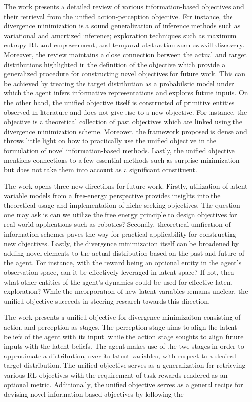 \documentclass[10.5pt,letterpaper]{article}
\begin{document}
The work presents a detailed review of various information-based objectives and their retrieval from the unified action-perception objective. For instance, the divergence minimization is a sound generalization of inference methods such as variational and amortized inference; exploration techniques such as maximum entropy RL and empowerment; and temporal abstraction such as skill discovery. Moreover, the review maintains a close connection between the actual and target distributions highlighted in the definition of the objective which provide a generalized procedure for constructing novel objectives for future work. This can be achieved by treating the target distribution as a probabilstic model under which the agent infers informative representations and explores future inputs. On the other hand, the unified objective itself is constructed of primitive entities observed in literature and does not give rise to a new objective. For instance, the objective is a theoretical collection of past objectives which are linked using the divergence minimization scheme. Moreover, the framework proposed is dense and throws little light on how to practically use the unified objective in the formulation of novel information-based methods. Lastly, the unified objective mentions connections to a few essential methods such as surprise minimization but does not take them into account as a significant constituent.

The work opens three new directions for future work. Firstly, utilization of latent variable models from a free-energy perspective provides insights into the theoretical usage and implementation of niche-seeking objectives. The question one may ask is can we utilize the free energy principle to design objectives for real world applications such as robotics? Secondly, theoretical unification of information schemes paves the way for practical applicability for constructing new objectives. Lastly, the divergence minimization itself can be broadened by adding novel elements to the actual distribution based on the past and future of the agent. For instance, with the reward being an optional entity in the agent's observation space, can it be effectively leveraged in latent space? If not, then what other entities of the agent's dynamics could be used for effective latent exploration? While the incorporation of new latent variables remains unclear, the unified objective succeeds in steering research towards this direction.

The work presents a unified objective for divergence minimizaiton consisting of action and perception as stages. The perception stage aims to align the latent beliefs of the agent with its input, while the action stage soughts to align future inputs with the latent beliefs. The agent makes use of the two stages in order to approximate a distribution, over its latent variables, with respect to a desired target distribution. The unified objective serves as a generalization for retrieving various RL objectives with the requirement of task rewards rendered as an optional metric. Additionally, the unified objective serves as a general recipe for devising novel information-based objectives by following the  
\end{document}
